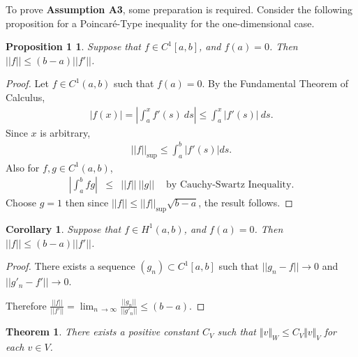 \documentclass[../../main.tex]{subfiles}
\begin{document}
To prove \textbf{Assumption A3}, some preparation is required. Consider the following proposition for a Poincar\'e-Type inequality for the one-dimensional case.
\newtheorem*{Poincare}{Proposition 1}
\begin{Poincare}
	Suppose that $f \in C^1[a,b]$, and $f(a) = 0$. Then\\ $\displaystyle ||f|| \leq (b-a)||f'||$.
\end{Poincare}
\begin{proof}
	Let $f \in C^1(a,b)$ such that $f(a) = 0$. By the Fundamental Theorem of Calculus,
	\begin{eqnarray*}
		|f(x)| = \left|\int_a^x f'(s) \ ds\right| \leq \int_a^x |f'(s)| \ ds.
	\end{eqnarray*}
	Since $x$ is arbitrary,
	\begin{eqnarray*}
		||f||_{\sup} \leq \int_a^b |f'(s)| ds.
	\end{eqnarray*}
	Also for $f,g \in C^1(a,b)$,
	\begin{eqnarray}
		\left| \int_a^b fg \right| & \leq & ||f||\ ||g|| \ \ \ \ \textrm{ by Cauchy-Swartz Inequality.} \label{CSI}
	\end{eqnarray}
	Choose $g = 1$ then since $||f|| \leq ||f||_{\sup} \sqrt{b-a}$, the result follows.
\end{proof}

\newtheorem*{Poincare_2}{Corollary}
\begin{Poincare_2}
	Suppose that $f \in H^1(a,b)$, and $f(a) = 0$. Then $||f|| \leq (b-a)||f'||$.
\end{Poincare_2}
\begin{proof}
	There exists a sequence $(g_n) \subset C^1[a,b]$ such that $||g_n -f|| \rightarrow 0$ and $||g'_n-f'||\rightarrow 0$.

	Therefore $\displaystyle \frac{||f||}{||f'||} = \lim_{n\ \rightarrow \infty} \frac{||g_n||}{||g'_n||} \leq (b-a)$.
\end{proof}

\newtheorem{Theorem_1}{Theorem}
\begin{Theorem_1}
There exists a positive constant $C_{V}$ such that $\Vert v\Vert_{W} \leq C_{V}\Vert v\Vert_{V}$ for each $v \in V$.
\end{Theorem_1}
\end{document}
